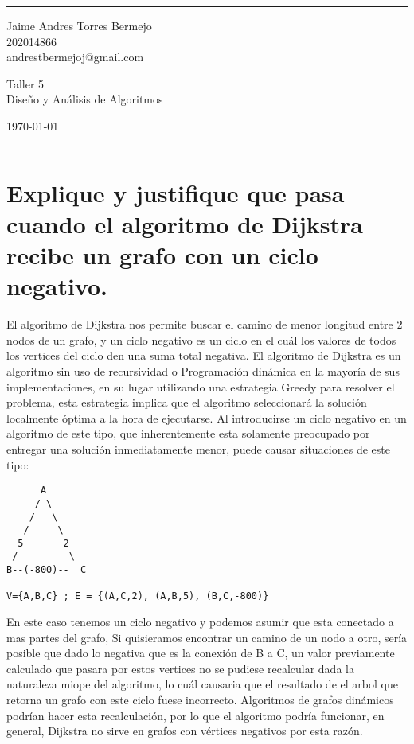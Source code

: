 \documentclass[a4paper]{article}
\begin{document}

\fancyhead[C]{}
\hrule \medskip %
\begin{minipage}{0.295\textwidth} 
\raggedright
\footnotesize
Jaime Andres Torres Bermejo \hfill\\   
202014866\hfill\\
andrestbermejoj@gmail.com
\end{minipage}
\begin{minipage}{0.4\textwidth} 
\centering 
\large 
Taller 5\\ 
\normalsize 
Diseño y Análisis de Algoritmos\\ 
\end{minipage}
\begin{minipage}{0.295\textwidth} 
\raggedleft
\today\hfill\\
\end{minipage}
\medskip\hrule 
\bigskip

\section{Explique y justifique que pasa cuando el algoritmo de Dijkstra recibe un grafo con
un ciclo negativo.}

El algoritmo de Dijkstra nos permite buscar el camino de menor longitud entre 2 nodos de un grafo,
y un ciclo negativo es un ciclo en el cuál los valores de todos los vertices del ciclo
den una suma total negativa. El algoritmo de Dijkstra es un algoritmo sin uso de 
recursividad o Programación dinámica en la mayoría de sus implementaciones, en su lugar utilizando
una estrategia Greedy para resolver el problema, esta estrategia implica que el algoritmo
seleccionará la solución localmente óptima a la hora de ejecutarse. Al introducirse un ciclo negativo
en un algoritmo de este tipo, que inherentemente esta solamente preocupado por entregar una solución
inmediatamente menor, puede causar situaciones de este tipo:
    
\begin{verbatim}
      A
     / \
    /   \
   /     \
  5       2
 /         \
B--(-800)--  C

V={A,B,C} ; E = {(A,C,2), (A,B,5), (B,C,-800)}
\end{verbatim}

En este caso tenemos un ciclo negativo y podemos asumir que esta conectado a mas partes
del grafo,  Si quisieramos encontrar un camino de un nodo a otro, sería 
posible que dado lo negativa que es la conexión de B a C, un valor previamente calculado
que pasara por estos vertices no se pudiese recalcular dada la naturaleza miope
del algoritmo, lo cuál causaria que el resultado de el arbol que retorna un grafo con este
ciclo fuese incorrecto. Algoritmos de grafos dinámicos podrían hacer esta recalculación,
por lo que el algoritmo podría funcionar, en general, Dijkstra no sirve en grafos con
vértices negativos por esta razón.

\end{document}
